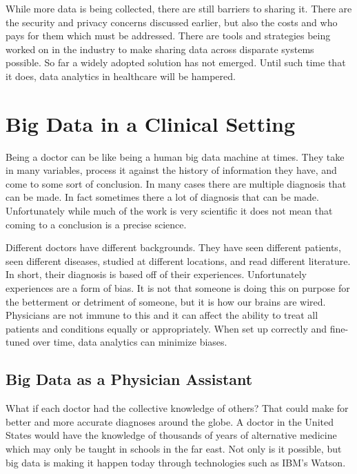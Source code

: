\documentclass[sigconf]{acmart}
\begin{document}
While more data is being collected, there are still barriers to sharing 
it.  There are the security and privacy concerns discussed earlier, but 
also the costs and who pays for them which must be addressed.  There are 
tools and strategies being worked on in the industry to make sharing data 
across disparate systems possible.  So far a widely adopted solution has 
not emerged\cite{HCATop10}.  Until such time that it does, data analytics 
in healthcare will be hampered.

\section{Big Data in a Clinical Setting}
Being a doctor can be like being a human big data machine at times.  They 
take in many variables, process it against the history of information they 
have, and come to some sort of conclusion.  In many cases there are multiple 
diagnosis that can be made.  In fact sometimes there a lot of diagnosis that 
can be made.  Unfortunately while much of the work is very scientific it 
does not mean that coming to a conclusion is a precise science.  

Different doctors have different backgrounds.  They have seen different 
patients, seen different diseases, studied at different locations, and read 
different literature.  In short, their diagnosis is based off of their 
experiences.  Unfortunately experiences are a form of bias.  It is not that 
someone is doing this on purpose for the betterment or detriment of someone, 
but it is how our brains are wired.  Physicians are not immune to this and 
it can affect the ability to treat all patients and conditions equally or 
appropriately\cite{PMC3797360}.  When set up correctly and fine-tuned over 
time, data analytics can minimize biases.

\subsection{Big Data as a Physician Assistant}
What if each doctor had the collective knowledge of others?  That could make 
for better and more accurate diagnoses around the globe.  A doctor in the 
United States would have the knowledge of thousands of years of alternative 
medicine which may only be taught in schools in the far east.  Not only is 
it possible, but big data is making it happen today through technologies such 
as IBM's Watson.
\end{document}
